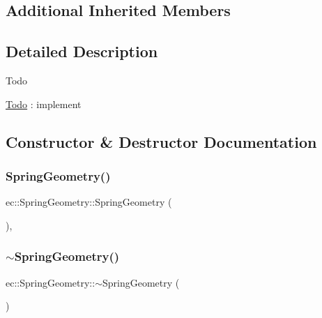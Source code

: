 \subsection*{Additional Inherited Members}


\subsection{Detailed Description}
\begin{DoxyRefDesc}{Todo}
\item[\mbox{\hyperlink{todo__todo000006}{Todo}}]\+: implement \end{DoxyRefDesc}


\subsection{Constructor \& Destructor Documentation}
\mbox{\label{classec_1_1_spring_geometry_afc2aa4b3e49cc72083f9b3bc1b1d22be}} 
\subsubsection{\texorpdfstring{Spring\+Geometry()}{SpringGeometry()}}
{\footnotesize\ttfamily ec\+::\+Spring\+Geometry\+::\+Spring\+Geometry (\begin{DoxyParamCaption}{ }\end{DoxyParamCaption})\hspace{0.3cm}{\ttfamily [explicit]}, {\ttfamily [default]}}

\mbox{\label{classec_1_1_spring_geometry_aaf7c2395d3d548c549eb76a10c85a60e}} 
\subsubsection{\texorpdfstring{$\sim$\+Spring\+Geometry()}{~SpringGeometry()}}
{\footnotesize\ttfamily ec\+::\+Spring\+Geometry\+::$\sim$\+Spring\+Geometry (\begin{DoxyParamCaption}{ }\end{DoxyParamCaption})\hspace{0.3cm}{\ttfamily [default]}}



